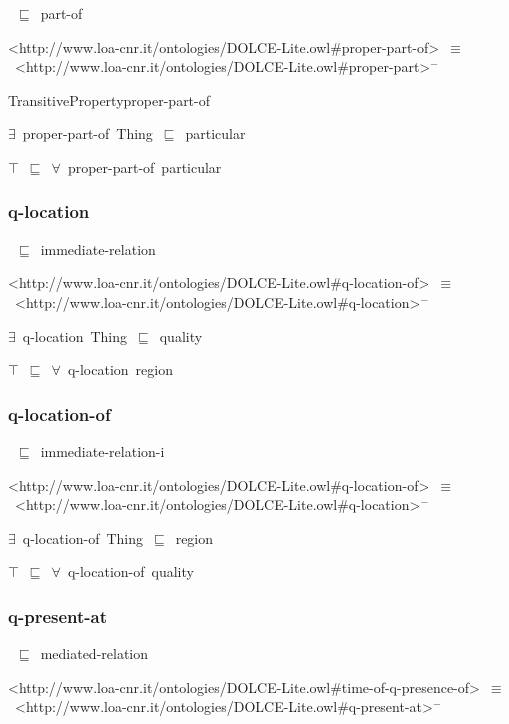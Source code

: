 \documentclass{article}
\begin{document}
~\ensuremath{\sqsubseteq}~part-of

<http://www.loa-cnr.it/ontologies/DOLCE-Lite.owl#proper-part-of>~\ensuremath{\equiv}~<http://www.loa-cnr.it/ontologies/DOLCE-Lite.owl#proper-part>\ensuremath{^-}

TransitivePropertyproper-part-of

\ensuremath{\exists}~proper-part-of~Thing~\ensuremath{\sqsubseteq}~particular

\ensuremath{\top}~\ensuremath{\sqsubseteq}~\ensuremath{\forall}~proper-part-of~particular

\subsubsection*{q-location}

~\ensuremath{\sqsubseteq}~immediate-relation

<http://www.loa-cnr.it/ontologies/DOLCE-Lite.owl#q-location-of>~\ensuremath{\equiv}~<http://www.loa-cnr.it/ontologies/DOLCE-Lite.owl#q-location>\ensuremath{^-}

\ensuremath{\exists}~q-location~Thing~\ensuremath{\sqsubseteq}~quality

\ensuremath{\top}~\ensuremath{\sqsubseteq}~\ensuremath{\forall}~q-location~region

\subsubsection*{q-location-of}

~\ensuremath{\sqsubseteq}~immediate-relation-i

<http://www.loa-cnr.it/ontologies/DOLCE-Lite.owl#q-location-of>~\ensuremath{\equiv}~<http://www.loa-cnr.it/ontologies/DOLCE-Lite.owl#q-location>\ensuremath{^-}

\ensuremath{\exists}~q-location-of~Thing~\ensuremath{\sqsubseteq}~region

\ensuremath{\top}~\ensuremath{\sqsubseteq}~\ensuremath{\forall}~q-location-of~quality

\subsubsection*{q-present-at}

~\ensuremath{\sqsubseteq}~mediated-relation

<http://www.loa-cnr.it/ontologies/DOLCE-Lite.owl#time-of-q-presence-of>~\ensuremath{\equiv}~<http://www.loa-cnr.it/ontologies/DOLCE-Lite.owl#q-present-at>\ensuremath{^-}
\end{document}
